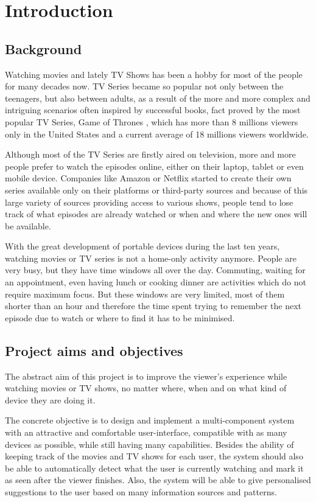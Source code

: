 \chapter{Introduction}

\section{Background}

Watching movies and lately TV Shows has been a hobby for most of the people for many decades now. TV Series became so popular not only between the teenagers, but also between adults, as a result of the more and more complex and intriguing scenarios often inspired by successful books, fact proved by the most popular TV Series, Game of Thrones \cite{1}, which has more than 8 millions viewers only in the United States and a current average of 18 millions viewers worldwide.

Although most of the TV Series are firstly aired on television, more and more people prefer to watch the episodes online, either on their laptop, tablet or even mobile device. Companies like Amazon or Netflix started to create their own series available only on their platforms or third-party sources and because of this large variety of sources providing access to various shows, people tend to lose track of what episodes are already watched or when and where the new ones will be available.

With the great development of portable devices during the last ten years, watching movies or TV series is not a home-only activity anymore. People are very busy, but they have time windows all over the day. Commuting, waiting for an appointment, even having lunch or cooking dinner are activities which do not require maximum focus. But these windows are very limited, most of them shorter than an hour and therefore the time spent trying to remember the next episode due to watch or where to find it has to be minimised.

\section{Project aims and objectives}

The abstract aim of this project is to improve the viewer's experience while watching movies or TV shows, no matter where, when and on what kind of device they are doing it.

The concrete objective is to design and implement a multi-component system with an attractive and comfortable user-interface, compatible with as many devices as possible, while still having many capabilities. Besides the ability of keeping track of the movies and TV shows for each user, the system should also be able to automatically detect what the user is currently watching and mark it as seen after the viewer finishes. Also, the system will be able to give personalised suggestions to the user based on many information sources and patterns.

